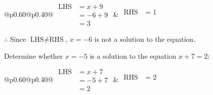 \documentclass[12pt]{article}
\newcounter{minipagecount}
\begin{document}
\begin{multicols}{2}
\begin{minipage}[t]{0.40\textwidth}
    \noindent
    \renewcommand{\arraystretch}{1.3} %
    \begin{tabular}{@{}p{0.60\linewidth}@{}p{0.40\linewidth}@{}}
        \(\begin{aligned}
            \text{LHS} &= x + 9 \\
                    &= -6 + 9 \\
                    &= 3 
        \end{aligned}\) &
        \(\begin{aligned}
            \text{RHS} &= 1\\
                    & \\
                    &
        \end{aligned}\)
    \end{tabular}
    \renewcommand{\arraystretch}{1.0} %
    \vspace{2pt}  %

    \noindent \(\therefore\) Since \(\text{LHS} \neq \text{RHS}\), \(x = -6\) is not  a solution to the equation.

\end{minipage}

\vspace*{0.5ex}
\vfill{}
\noindent{(\theminipagecount)}\hspace{0.1mm} %
\begin{minipage}[t]{0.40\textwidth} %

    \noindent Determine whether \(x = -5\) is a solution to the equation \(x + 7 = 2\):
    \vspace{2pt}  %

    \noindent
    \renewcommand{\arraystretch}{1.3} %
    \begin{tabular}{@{}p{0.60\linewidth}@{}p{0.40\linewidth}@{}}
        \(\begin{aligned}
            \text{LHS} &= x + 7 \\
                    &= -5 + 7 \\
                    &= 2 
        \end{aligned}\) &
        \(\begin{aligned}
            \text{RHS} &= 2\\
                    & \\
                    &
        \end{aligned}\)
    \end{tabular}
    \renewcommand{\arraystretch}{1.0} %
    \vspace{2pt}  %


\end{minipage}
\end{multicols}
\end{document}
